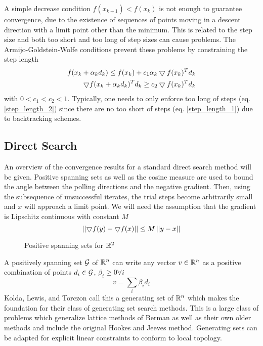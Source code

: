 A simple decrease condition $f(x_{k+1}) < f(x_{k})$ is not enough to guarantee convergence, due to the existence of sequences of points moving in a descent direction with a limit point other than the minimum.  This is related to the step size and both too short and too long of step sizes can cause problems.  The Armijo-Goldstein-Wolfe conditions prevent these problems by constraining the step length 
\begin{align}
f(x_k + \alpha_k d_k) \le f(x_k) + c_1 \alpha_k \bigtriangledown f(x_k)^T d_k  \label{step_length_1}\\
\bigtriangledown f (x_k + \alpha_k d_k)^T d_k \ge c_2 \bigtriangledown f(x_k)^T d_k \label{step_length_2}
\end{align}
with $0 < c_1 < c_2 < 1$.  Typically, one needs to only enforce too long of steps (eq. \ref{step_length_2}) since there are no too short of steps (eq. \ref{step_length_1}) due to backtracking schemes.


\subsection{Direct Search}
An overview of the convergence results for a standard direct search method will be given. Positive spanning sets as well as the cosine measure are used to bound the angle between the polling directions and the negative gradient.  Then, using the subsequence of unsuccessful iterates, the trial steps become arbitrarily small and $x$ will approach a limit point.  We will need the assumption that the gradient is Lipschitz continuous with constant $M$
\begin{equation}
\left| \left| {\bigtriangledown f(y) - \bigtriangledown f(x)} \right| \right|  \leq M \left| \left| { y - x } \right| \right|
\end{equation}

\begin{figure}
\centering

\caption{Positive spanning sets for $\mathbb{R}^{2}$}
\end{figure}

A positively spanning set $\mathcal{G}$ of $\mathbb{R}^{n}$ can write any vector $v \in \mathbb{R}^{n}$ as a positive combination of points $d_i \in \mathcal{G}$,  $\beta_i \geq 0 \forall i$
\begin{equation}
v = \sum_i \beta_i d_i
\end{equation}
Kolda, Lewis, and Torczon \cite{kolda_2003} call this a generating set of $\mathbb{R}^{n}$ which makes the foundation for their class of generating set search methods.  This is a large class of problems which generalize lattice methods of Berman \cite{berman_1966} \cite{berman_1969} as well as their own older methods \cite{torczon_1997} \cite{lewis_2000} and include the original Hookes and Jeeves method\cite{hooke_1961}.  Generating sets can be adapted for explicit linear constraints to conform to local topology.\endnote{}


